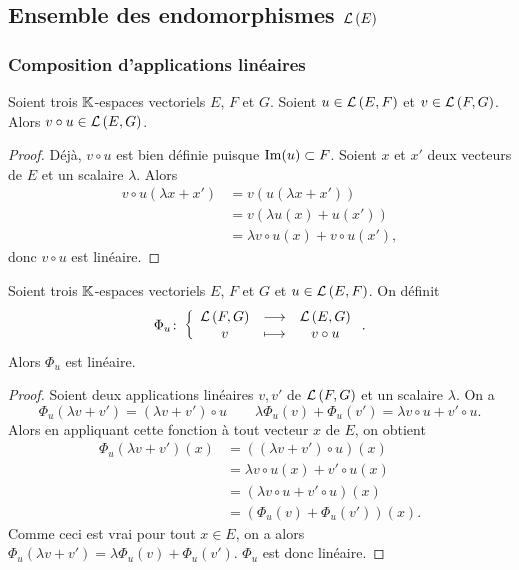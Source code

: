\subsection{Ensemble des endomorphismes $\mathcal{L}\left(E\right)$}
\subsubsection{Composition d'applications linéaires}
\begin{theo}
  Soient trois $\mathbb{K}$-espaces vectoriels $E$, $F$ et $G$. Soient $u \in \mathcal{L}\left(E,F\right)$ et $v\in \mathcal{L}\left(F,G\right)$. Alors $v\circ u \in \mathcal{L}\left(E,G\right)$.
\end{theo}
\begin{proof}
  Déjà, $v\circ u$ est bien définie puisque $\operatorname{Im}(u) \subset F$. Soient $x$ et $x'$ deux vecteurs de $E$ et un scalaire $\lambda$. Alors
  \begin{align}
    v\circ u(\lambda x+x') &=v(u(\lambda x+x')) \\
    &=v(\lambda u(x)+u(x'))\\
    &=\lambda v\circ u(x) + v\circ u(x'),
  \end{align}
  donc $v\circ u$ est linéaire.
\end{proof}

\begin{prop}
  Soient trois $\mathbb{K}$-espaces vectoriels $E$, $F$ et $G$ et $u \in \mathcal{L}\left(E,F\right)$. On définit 
  \begin{equation}
      \Phi_u\colon \left\{\begin{array}{ccc} \mathcal{L}\left(F,G\right) & \longrightarrow &\mathcal{L}\left(E,G\right)\\ v & \longmapsto & v \circ u \end{array} \right.. 
  \end{equation}
  Alors $\Phi_u$ est linéaire.
\end{prop}
\begin{proof}
  Soient deux applications linéaires $v,v'$ de $\mathcal{L}\left(F,G\right)$ et un scalaire $\lambda$. On a
  \begin{equation}
    \Phi_u(\lambda v+v')=(\lambda v+v') \circ u \qquad \lambda \Phi_u(v)+\Phi_u(v')=\lambda v \circ u + v' \circ u.
  \end{equation}
  Alors en appliquant cette fonction à tout vecteur $x$ de $E$, on obtient
  \begin{align}
    \Phi_u(\lambda v+v')(x) &= ((\lambda v+v') \circ u)(x) \\
    &= \lambda v \circ u(x) + v' \circ u (x) \\
    &=(\lambda v \circ u + v'\circ u)(x) \\
    &=(\Phi_u(v)+\Phi_u(v'))(x).
  \end{align}
  Comme ceci est vrai pour tout $x \in E$, on a alors $\Phi_u(\lambda v+v') = \lambda \Phi_u(v)+\Phi_u(v')$. $\Phi_u$ est donc linéaire.
\end{proof}

